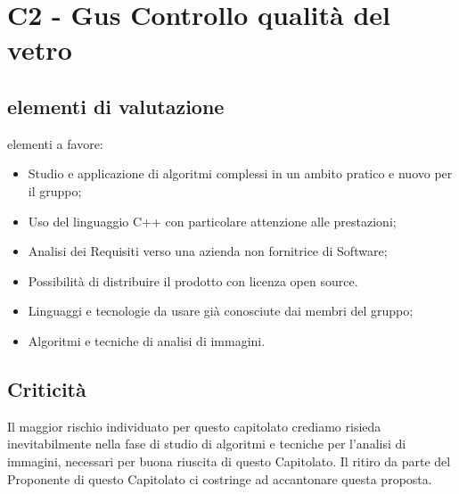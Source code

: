 \section{C2 - Gus Controllo qualità del vetro}{
	\subsection{elementi di valutazione}{
		elementi a favore:
		\begin{itemize}
			\item Studio e applicazione di algoritmi complessi in un ambito pratico e nuovo per il gruppo;
			\item Uso del linguaggio C++ con particolare attenzione alle prestazioni;
			\item Analisi dei Requisiti verso una azienda non fornitrice di Software;
			\item Possibilità di distribuire il prodotto con licenza open source.
		\end{itemize}
		
		\begin{itemize}
			\item Linguaggi e tecnologie da usare già conosciute dai membri del gruppo;
			\item Algoritmi e tecniche di analisi di immagini.
		\end{itemize}
	}
	\subsection{Criticità}{
		Il maggior rischio individuato per questo capitolato crediamo risieda inevitabilmente nella fase di studio di algoritmi e tecniche per l'analisi di immagini, necessari per buona riuscita di questo Capitolato.
		Il ritiro da parte del Proponente di questo Capitolato ci costringe ad accantonare questa proposta.
	}
}
